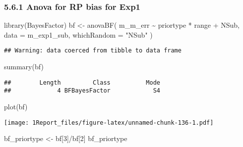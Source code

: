 \documentclass[
]{article}
\newenvironment{Shaded}{\begin{snugshade}}{\end{snugshade}}
\newcommand{\AttributeTok}[1]{\textcolor[rgb]{0.77,0.63,0.00}{#1}}
\newcommand{\DecValTok}[1]{\textcolor[rgb]{0.00,0.00,0.81}{#1}}
\newcommand{\FunctionTok}[1]{\textcolor[rgb]{0.00,0.00,0.00}{#1}}
\newcommand{\NormalTok}[1]{#1}
\newcommand{\OtherTok}[1]{\textcolor[rgb]{0.56,0.35,0.01}{#1}}
\newcommand{\SpecialCharTok}[1]{\textcolor[rgb]{0.00,0.00,0.00}{#1}}
\newcommand{\StringTok}[1]{\textcolor[rgb]{0.31,0.60,0.02}{#1}}
\begin{document}
\hypertarget{anova-for-rp-bias-for-exp1}{%
\subsubsection{5.6.1 Anova for RP bias for
Exp1}\label{anova-for-rp-bias-for-exp1}}

\begin{Shaded}
\begin{Highlighting}[]
\FunctionTok{library}\NormalTok{(BayesFactor) }
\NormalTok{bf }\OtherTok{\textless{}{-}} \FunctionTok{anovaBF}\NormalTok{( m\_m\_err }\SpecialCharTok{\textasciitilde{}}\NormalTok{ priortype }\SpecialCharTok{*}\NormalTok{ range }\SpecialCharTok{+}\NormalTok{ NSub, }\AttributeTok{data =}\NormalTok{ m\_exp1\_sub, }\AttributeTok{whichRandom =} \StringTok{"NSub"}\NormalTok{ ) }
\end{Highlighting}
\end{Shaded}

\begin{verbatim}
## Warning: data coerced from tibble to data frame
\end{verbatim}

\begin{Shaded}
\begin{Highlighting}[]
\FunctionTok{summary}\NormalTok{(bf)}
\end{Highlighting}
\end{Shaded}

\begin{verbatim}
##        Length         Class          Mode 
##             4 BFBayesFactor            S4
\end{verbatim}

\begin{Shaded}
\begin{Highlighting}[]
\FunctionTok{plot}\NormalTok{(bf)}
\end{Highlighting}
\end{Shaded}

\texttt{[image: 1Report\_files/figure-latex/unnamed-chunk-136-1.pdf]}

\begin{Shaded}
\begin{Highlighting}[]
\NormalTok{ bf\_priortype }\OtherTok{\textless{}{-}}\NormalTok{ bf[}\DecValTok{3}\NormalTok{]}\SpecialCharTok{/}\NormalTok{bf[}\DecValTok{2}\NormalTok{]}
\NormalTok{ bf\_priortype}
\end{Highlighting}
\end{Shaded}
\end{document}
